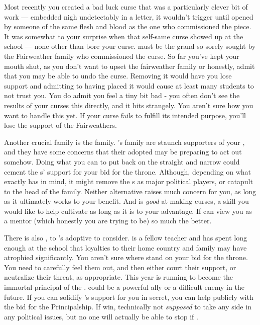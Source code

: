 \documentclass[char]{GL2020}
\begin{document}
Most recently you created a bad luck curse that was a particularly clever bit of work — embedded nigh undetectably in a letter, it wouldn't trigger until opened by someone of the same flesh and blood as the one who commissioned the piece. It was somewhat to your surprise when that self-same curse showed up at the school — none other than \cInitiate{\full} bore your curse. \cInitiate{\They} must be the grand\cInitiate{\offspring} so sorely sought by the Fairweather family who commissioned the curse. So far you've kept your mouth shut, as you don't want to upset the fairweather family or honestly, admit that you may be able to undo the curse. Removing it would have you lose support and admitting to having placed it would cause at least many students to not trust you.  You do admit you feel a tiny bit bad - you often don't see the results of your curses this directly, and it hits strangely. You aren’t sure how you want to handle this yet. If your curse fails to fulfill its intended purpose, you'll lose the support of the Fairweathers.

Another crucial family is the \cAdopted{\formal} family. \cAdopted{\full}'s family are staunch supporters of your \cQueen{\parent}, and they have some concerns that their adopted \cAdopted{\offspring} may be preparing to act out somehow. Doing what you can to put \cAdopted{\them} back on the straight and narrow could cement the \cAdopted{\formal}s' support for your bid for the throne. Although, depending on what exactly \cAdopted{} has in mind, it might remove the \cAdopted{\formal}s as major political players, or catapult \cAdopted{} to the head of the family. Neither alternative raises much concern for you, as long as it ultimately works to your benefit. And \cAdopted{} is \emph{good} at making curses, a skill you would like to help \cAdopted{\them} cultivate as long as it is to your advantage. If \cAdopted{} can view you as a mentor (which honestly you are trying to be) so much the better.

There is also \cMusic{\full}, \cMusic{\auncle} to \cAdopted{}'s adoptive \cAdoptedParentOne{\parent} to consider. \cMusic{} is a fellow teacher and has spent long enough at the school that \cMusic{\their} loyalties to their home country and family may have atrophied significantly. You aren't sure where \cMusic{\they} stand on your bid for the throne. You need to carefully feel them out, and then either court their support, or neutralize their threat, as appropriate.  This year \cMusic{} is running to become the immortal principal of the \pSc{}. \cMusic{\They} could be a powerful ally or a difficult enemy in the future. If you can solidify \cMusic{}’s support for you in secret, you can help \cMusic{\them} publicly with the bid for the Principalship. If  \cMusic{\they} win\cMusic{\verbs}, technically \cMusic{\theyare} not \emph{supposed} to take any side in any political issues, but no one will actually be able to stop \cMusic{\them} if \cMusic{\theydo}.
\end{document}
